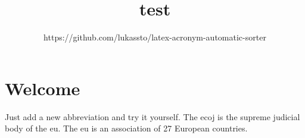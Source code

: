\documentclass{report}
\title{test}
\author{https://github.com/lukassto/latex-acronym-automatic-sorter}
\begin{document}
\maketitle

\tableofcontents


\chapter{Welcome}
Just add a new abbreviation and try it yourself. The \ac{ecoj} is the supreme judicial body of the \ac{eu}. The \ac{eu} is an association of 27 European countries. 
\end{document}
